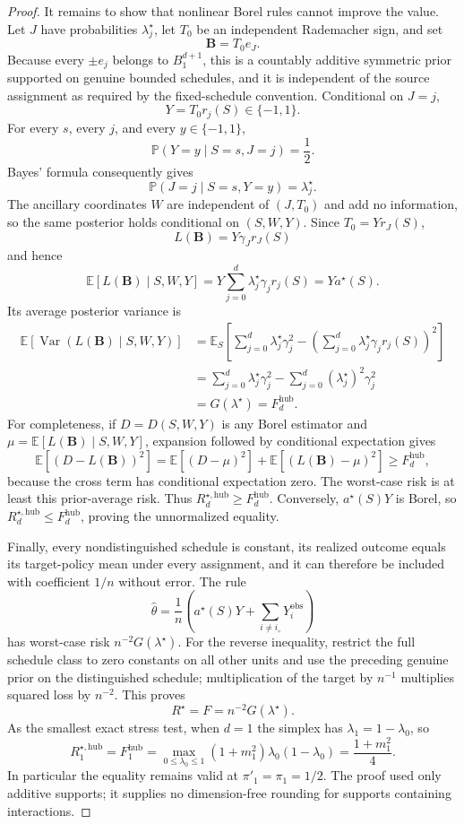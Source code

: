 \documentclass{article}
\begin{document}
\begin{proof}
It remains to show that nonlinear Borel rules cannot improve the value.  Let \(J\) have probabilities \(\lambda_j^{\star}\), let \(T_0\) be an independent Rademacher sign, and set
\[
 \mathbf B=T_0e_J.
\]
Because every \(\pm e_j\) belongs to \(B_1^{d+1}\), this is a countably additive symmetric prior supported on genuine bounded schedules, and it is independent of the source assignment as required by the fixed-schedule convention.  Conditional on \(J=j\),
\[
 Y=T_0r_j(S)\in\{-1,1\}.
\]
For every \(s\), every \(j\), and every \(y\in\{-1,1\}\),
\[
 \mathbb P(Y=y\mid S=s,J=j)=\frac12.
\]
Bayes' formula consequently gives
\[
 \mathbb P(J=j\mid S=s,Y=y)=\lambda_j^{\star}.
\]
The ancillary coordinates \(W\) are independent of \((J,T_0)\) and add no information, so the same posterior holds conditional on \((S,W,Y)\).  Since \(T_0=Yr_J(S)\),
\[
 L(\mathbf B)=Y\gamma_Jr_J(S)
\]
and hence
\[
 \mathbb E[L(\mathbf B)\mid S,W,Y]
 =Y\sum_{j=0}^d\lambda_j^{\star}\gamma_jr_j(S)
 =Ya^{\star}(S).
\]
Its average posterior variance is
\[
\begin{aligned}
 \mathbb E\!\left[\operatorname{Var}(L(\mathbf B)\mid S,W,Y)\right]
 &=\mathbb E_S\!\left[
 \sum_{j=0}^d\lambda_j^{\star}\gamma_j^2-
 \left(\sum_{j=0}^d\lambda_j^{\star}\gamma_jr_j(S)\right)^2
 \right]\\
 &=\sum_{j=0}^d\lambda_j^{\star}\gamma_j^2
   -\sum_{j=0}^d(\lambda_j^{\star})^2\gamma_j^2\\
 &=G(\lambda^{\star})=F_d^{\mathrm{hub}}.
\end{aligned}
\]
For completeness, if \(D=D(S,W,Y)\) is any Borel estimator and \(\mu=\mathbb E[L(\mathbf B)\mid S,W,Y]\), expansion followed by conditional expectation gives
\[
 \mathbb E[(D-L(\mathbf B))^2]
 =\mathbb E[(D-\mu)^2]
  +\mathbb E[(L(\mathbf B)-\mu)^2]
 \geq F_d^{\mathrm{hub}},
\]
because the cross term has conditional expectation zero.  The worst-case risk is at least this prior-average risk.  Thus \(R_d^{\star,\mathrm{hub}}\geq F_d^{\mathrm{hub}}\).  Conversely, \(a^{\star}(S)Y\) is Borel, so \(R_d^{\star,\mathrm{hub}}\leq F_d^{\mathrm{hub}}\), proving the unnormalized equality.

Finally, every nondistinguished schedule is constant, its realized outcome equals its target-policy mean under every assignment, and it can therefore be included with coefficient \(1/n\) without error.  The rule
\[
 \widehat\theta
 =\frac1n\left(a^{\star}(S)Y+
          \sum_{i\neq i_{\circ}}Y_i^{\mathrm{obs}}\right)
\]
has worst-case risk \(n^{-2}G(\lambda^{\star})\).  For the reverse inequality, restrict the full schedule class to zero constants on all other units and use the preceding genuine prior on the distinguished schedule; multiplication of the target by \(n^{-1}\) multiplies squared loss by \(n^{-2}\).  This proves
\[
 R^{\star}=F=n^{-2}G(\lambda^{\star}).
\]
As the smallest exact stress test, when \(d=1\) the simplex has \(\lambda_1=1-\lambda_0\), so
\[
 R_1^{\star,\mathrm{hub}}=F_1^{\mathrm{hub}}
 =\max_{0\leq\lambda_0\leq1}(1+m_1^2)\lambda_0(1-\lambda_0)
 =\frac{1+m_1^2}{4}.
\]
In particular the equality remains valid at \(\pi'_1=\pi_1=1/2\).  The proof used only additive supports; it supplies no dimension-free rounding for supports containing interactions.
\end{proof}
\end{document}
